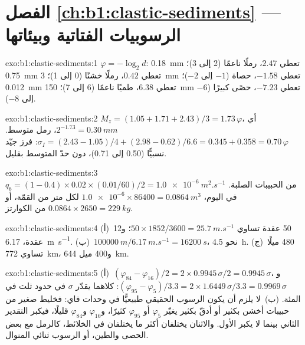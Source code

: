 \section*{الفصل \ref{ch:b1:clastic-sediments} --- الرسوبيات الفتاتية وبيئاتها}

\begin{solution}{exo:b1:clastic-sediments:1}
$\varphi = -\log_2 d$: \qty{0.18}{mm} تعطي $2.47$، رملًا ناعمًا (2 إلى 3)؛ \qty{0.75}{mm} تعطي $0.42$، رملًا خشنًا (0 إلى 1)؛ \qty{3}{mm} تعطي $-1.58$، حصاة ($-1$ إلى $-2$)؛ \qty{0.012}{mm} تعطي $6.38$، طميًا ناعمًا (6 إلى 7)؛ \qty{150}{mm} تعطي $-7.23$، حصًى كبيرًا ($-6$ إلى $-8$).
\end{solution}

\begin{solution}{exo:b1:clastic-sediments:2}
$M_z = (1.05 + 1.71 + 2.43)/3 = 1.73\,\varphi$، أي $2^{-1.73} =
\qty{0.30}{mm}$، رمل متوسط. $\sigma_I = (2.43 - 1.05)/4 + (2.98 - 0.62)/6.6
= 0.345 + 0.358 = 0.70\,\varphi$: فرز جيّد نسبيًّا (0.50 إلى 0.71)، دون حدّ  المتوسط بقليل.
\end{solution}

\begin{solution}{exo:b1:clastic-sediments:3}
$q_b = (1 - 0.4) \times 0.02 \times (\num{0.01}/60)/2 = \qty{1.0e-6}{m^2.s^{-1}}$
من الحبيبات الصلبة. في اليوم، $\num{1.0e-6} \times 86400 = \qty{0.0864}{m^3}$ لكل متر من القمّة،
أو $0.0864 \times 2650 = \qty{229}{kg}$ من الكوارتز.
\end{solution}

\begin{solution}{exo:b1:clastic-sediments:4}
(أ)~50 عقدة تساوي $50 \times 1852/3600 = \qty{25.7}{m.s^{-1}}$؛ و\num{12} عقدة،
\qty{6.17}{m.s^{-1}}. (ب)~$\qty{100000}{m}/\qty{6.17}{m.s^{-1}} =
\qty{16200}{s}$، نحو \qty{4.5}{h}. (ج)~480 ميلًا تساوي \qty{772}{km}، و\num{400} ميل
\qty{644}{km}.
\end{solution}

\begin{solution}{exo:b1:clastic-sediments:5}
(أ)~$(\varphi_{84} - \varphi_{16})/2 = 2 \times 0.9945\,\sigma/2 =
0.9945\,\sigma$، و$(\varphi_{95} - \varphi_5)/3.3 = 2 \times
1.6449\,\sigma/3.3 = 0.9969\,\sigma$: كلاهما يقدّر $\sigma$ في حدود ثلث في المئة. (ب)~لا يلزم أن يكون الرسوب الحقيقي طبيعيًّا في وحدات فاي: فخليط صغير من حبيبات أخشن بكثير أو أدقّ بكثير يغيّر $\varphi_5$ أو $\varphi_{95}$ كثيرًا، و$\varphi_{16}$ و$\varphi_{84}$ قليلًا، فيكبر التقدير الثاني بينما لا يكبر الأول. والاثنان يختلفان أكثر ما يختلفان في الخلائط، كالرمل مع بعض الحصى والطين، أو الرسوب ثنائي المنوال.
\end{solution}

